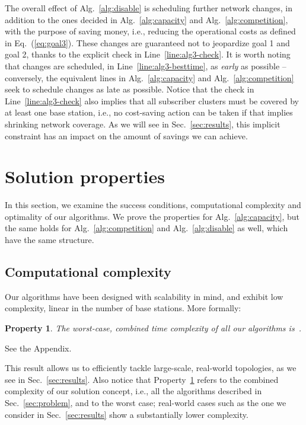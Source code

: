 \documentclass[10pt,journal,cspaper,compsoc]{IEEEtran}
\newcommand{\Sec}[1]{Sec.~\ref{sec:#1}}
\newcommand{\Eq}[1]{Eq.~(\ref{eq:#1})}
\newcommand{\Alg}[1]{Alg.~\ref{alg:#1}}
\newcommand{\Line}[1]{Line~\ref{line:#1}}
\newtheorem{property}{Property}
\newcommand{\Prop}[1]{Property~\ref{prop:#1}}
\begin{document}
The overall effect of \Alg{disable} is scheduling further network changes, in addition to the ones decided in
\Alg{capacity} and \Alg{competition}, with the purpose of saving money, i.e., reducing the operational costs as defined in
\Eq{goal3}.
These changes are guaranteed not to jeopardize goal 1 and goal 2, thanks to the explicit check in \Line{alg3-check}.
It is worth noting that changes are scheduled, in \Line{alg3-besttime}, as {\em early} as possible -- conversely,
the equivalent lines in \Alg{capacity} and \Alg{competition} seek to schedule changes as late as possible.
Notice that the check in \Line{alg3-check} also implies that all subscriber clusters must be covered
by at least one base station, i.e., no cost-saving action can be taken if that implies shrinking
network coverage. As we will see in \Sec{results}, this implicit constraint has an impact on the
amount of savings we can achieve.

\section{Solution properties}
\label{sec:discussion}

In this section, we examine the success conditions,
computational complexity and optimality of our algorithms.
We prove the
properties for \Alg{capacity}, but the same holds for \Alg{competition} and
\Alg{disable} as well, which have the same structure.

\subsection{Computational complexity}

Our algorithms have been designed with scalability in mind, and exhibit low complexity, linear in the number
of base stations. More formally:
\begin{property}
\label{prop:complexity}
The worst-case, {\em combined} time complexity of all our algorithms is~.
\end{property}
\begin{IEEEproof}
See the Appendix.
\end{IEEEproof}
This result allows us to efficiently tackle large-scale, real-world topologies, as we see in \Sec{results}.
Also notice that \Prop{complexity} refers to the combined complexity of our solution concept, i.e.,
all the algorithms described in \Sec{problem}, and to the worst case;
real-world cases such as the one we consider in \Sec{results} show a substantially lower complexity.
\end{document}
